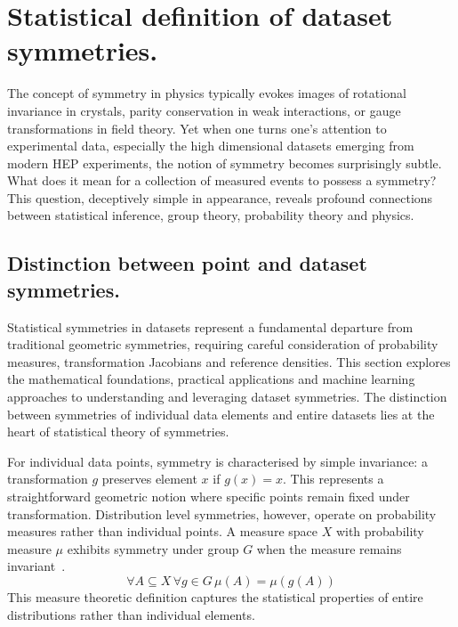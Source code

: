 \section{Statistical definition of dataset symmetries.}
    \label{sec:statistical-def-of-symmetries}
    The concept of symmetry in physics typically evokes images of rotational invariance in crystals, parity conservation in weak interactions, or gauge transformations in field theory.
    Yet when one turns one's attention to experimental data, especially the high dimensional datasets emerging from modern HEP experiments, the notion of symmetry becomes surprisingly subtle.
    What does it mean for a collection of measured events to possess a symmetry?
    This question, deceptively simple in appearance, reveals profound connections between statistical inference, group theory, probability theory and physics.
    
    \subsection{Distinction between point and dataset symmetries.}
        Statistical symmetries in datasets represent a fundamental departure from traditional geometric symmetries, requiring careful consideration of probability measures, transformation Jacobians and reference densities.
        This section explores the mathematical foundations, practical applications and machine learning approaches to understanding and leveraging dataset symmetries.
        The distinction between symmetries of individual data elements and entire datasets lies at the heart of statistical theory of symmetries.
        
        For individual data points, symmetry is characterised by simple invariance: a transformation \(g\) preserves element \(x\) if \(g(x) = x\).
        This represents a straightforward geometric notion where specific points remain fixed under transformation.
        Distribution level symmetries, however, operate on probability measures rather than individual points.
        A measure space \(X\) with probability measure \(\mu\) exhibits symmetry under group \(G\) when the measure remains invariant~\cite{}.
        \[
            \forall A\subseteq X \, \forall g\in G\, \mu(A) = \mu(g(A))
        \]
        This measure theoretic definition captures the statistical properties of entire distributions rather than individual elements.
        
